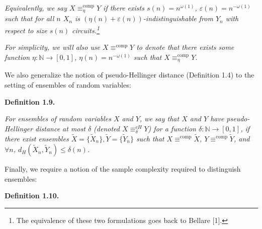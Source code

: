 \documentclass[10pt,a4paper]{article}
\begin{document}
\emph{Equivalently, we say $X\equiv_{\eta}^{\mathrm{comp}}Y$ if there exists $s(n)=n^{\omega(1)}$, $\varepsilon(n)=n^{-\omega(1)}$ such that for all $n$ $X_{n}$ is $(\eta(n)+\varepsilon(n))$-indistinguishable from $Y_{n}$ with respect to size $s(n)$ circuits.\footnote{The equivalence of these two formulations goes back to Bellare [1].}}\par




\emph{For simplicity, we will also use $X\equiv^{\mathrm{comp}}Y$ to denote that there exists some function $\eta:\mathbb{N}\rightarrow[0,1]$, $\eta(n)=n^{-\omega(1)}$ such that $X\equiv^{\mathrm{comp}}_{\eta}Y$.}\par






We also generalize the notion of pseudo-Hellinger distance (Definition 1.4) to the setting of ensembles of random variables:\par





\par\medskip\noindent\textbf{
\textbf{Definition 1.9}\textbf{.}
}\par



\emph{For ensembles of random variables $X$ and $Y$, we say that $X$ and $Y$ have pseudo-Hellinger distance at most $\delta$ (denoted $X\equiv_{\delta}^{cH}Y$) for a function $\delta:\mathbb{N}\rightarrow[0,1]$, if there exist ensembles $\widetilde{X}=\{\widetilde{X}_{n}\},\widetilde{Y}=\{\widetilde{Y}_{n}\}$ such that $X\equiv^{\mathrm{comp}}\widetilde{X}$, $Y\equiv^{\mathrm{comp}}\widetilde{Y}$, and $\forall n$, $d_{H}(\widetilde{X}_{n},\widetilde{Y}_{n})\leq\delta(n)$.}\par






Finally, we require a notion of the sample complexity required to distinguish ensembles:\par





\par\medskip\noindent\textbf{
\textbf{Definition 1.10}\textbf{.}
}\par
\end{document}
